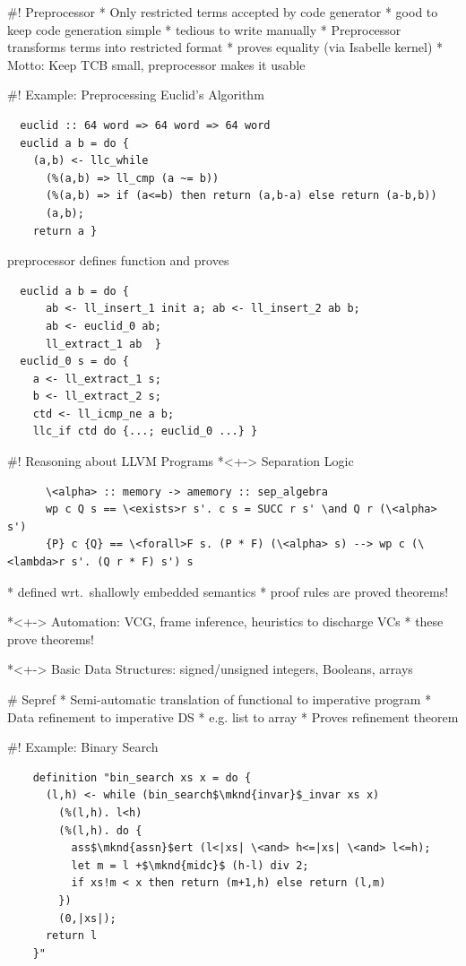 \documentclass[fleqn]{beamer}
\begin{document}
#! Preprocessor
  * Only restricted terms accepted by code generator
    * good to keep code generation simple
    * tedious to write manually
  * Preprocessor transforms terms into restricted format
    * proves equality (via Isabelle kernel)
  * Motto: Keep TCB small, preprocessor makes it usable


#! Example: Preprocessing Euclid's Algorithm
  \small
  \begin{lstlisting}
  euclid :: 64 word => 64 word => 64 word
  euclid a b = do {
    (a,b) <- llc_while
      (%(a,b) => ll_cmp (a ~= b))
      (%(a,b) => if (a<=b) then return (a,b-a) else return (a-b,b))
      (a,b);
    return a }
  \end{lstlisting}
  \pause
  preprocessor defines function  and proves
  \begin{lstlisting}
  euclid a b = do {
      ab <- ll_insert_1 init a; ab <- ll_insert_2 ab b;
      ab <- euclid_0 ab;
      ll_extract_1 ab  }
  euclid_0 s = do {
    a <- ll_extract_1 s;
    b <- ll_extract_2 s;
    ctd <- ll_icmp_ne a b;
    llc_if ctd do {...; euclid_0 ...} }
  \end{lstlisting}


#! Reasoning about LLVM Programs
  *<+-> Separation Logic
    \begin{lstlisting}
      \<alpha> :: memory -> amemory :: sep_algebra
      wp c Q s == \<exists>r s'. c s = SUCC r s' \and Q r (\<alpha> s')
      {P} c {Q} == \<forall>F s. (P * F) (\<alpha> s) --> wp c (\<lambda>r s'. (Q r * F) s') s
    \end{lstlisting}

    * defined wrt.\ shallowly embedded semantics
    * proof rules are proved theorems!

  *<+-> Automation: VCG, frame inference, heuristics to discharge VCs
    * these prove theorems!

  *<+-> Basic Data Structures: signed/unsigned integers, Booleans, arrays

# Sepref
  * Semi-automatic translation of functional to imperative program
  * Data refinement to imperative DS
    * e.g. list to array
  * Proves refinement theorem

#! Example: Binary Search
  \newcommand{\mknd}[1]{\makebox[0pt]{\tikz[remember picture]{\node (#1) {};}}}
  \begin{lstlisting}
    definition "bin_search xs x = do {
      (l,h) <- while (bin_search$\mknd{invar}$_invar xs x)
        (%(l,h). l<h)
        (%(l,h). do {
          ass$\mknd{assn}$ert (l<|xs| \<and> h<=|xs| \<and> l<=h);
          let m = l +$\mknd{midc}$ (h-l) div 2;
          if xs!m < x then return (m+1,h) else return (l,m)
        })
        (0,|xs|);
      return l
    }"
  \end{lstlisting}
\end{document}
